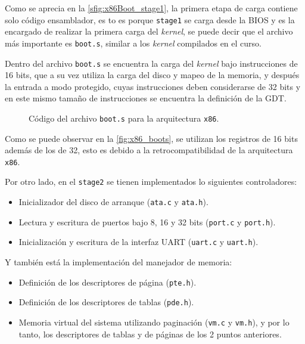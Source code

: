 	Como se aprecia en la \autoref{sfig:x86Boot_stage1}, la primera etapa de carga contiene solo código ensamblador, es to es porque \texttt{stage1} se carga desde la BIOS y es la encargado de realizar la primera carga del \textit{kernel}, se puede decir que el archivo más importante es \texttt{boot.s}, similar a los \textit{kernel} compilados en el curso.
	
	
	\clearpage
	Dentro del archivo \texttt{boot.s} se encuentra la carga del \textit{kernel} bajo instrucciones de 16 bits, que a su vez utiliza la carga del disco y mapeo de la memoria, y después la entrada a modo protegido, cuyas instrucciones deben considerarse de 32 bits y en este mismo tamaño de instrucciones se encuentra la definición de la GDT.
	\begin{figure}[ht]
		\centering
		\vspace*{0.3cm}
		\hspace*{1cm}
		\caption{
			Código del archivo \texttt{boot.s} para la arquitectura \texttt{x86}.
			\label{fig:x86_boots}
		}
	\end{figure}

	Como se puede observar en la \autoref{fig:x86_boots}, se utilizan los registros de 16 bits además de los de 32, esto es debido a la retrocompatibilidad de la arquitectura \texttt{x86}.
	
	
	Por otro lado, en el \texttt{stage2} se tienen implementados lo siguientes controladores:
	\begin{itemize} \setlength\itemsep{0pt}
		\item Inicializador del disco de arranque (\texttt{ata.c} y \texttt{ata.h}).
		\item Lectura y escritura de puertos bajo 8, 16 y 32 bits (\texttt{port.c} y \texttt{port.h}).
		\item Inicialización y escritura de la interfaz UART (\texttt{uart.c} y \texttt{uart.h}).
	\end{itemize}
	
	
	
	Y también está la implementación del manejador de memoria:
	\begin{itemize} \setlength\itemsep{0pt}
		\item Definición de los descriptores de página (\texttt{pte.h}).
		\item Definición de los descriptores de tablas (\texttt{pde.h}).
		\item Memoria virtual del sistema utilizando paginación (\texttt{vm.c} y \texttt{vm.h}), y por lo tanto, los descriptores de tablas y de páginas de los 2 puntos anteriores.
	\end{itemize}

